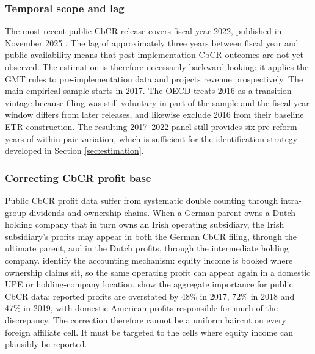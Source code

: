 \documentclass[11pt,a4paper]{article}
\begin{document}
\subsubsection{Temporal scope and lag}\label{sec:temporal}

The most recent public CbCR release covers fiscal year 2022, published in November 2025 \citep{oecd2025a}. The lag of approximately three years between fiscal year and public availability means that post-implementation CbCR outcomes are not yet observed. The estimation is therefore necessarily backward-looking: it applies the GMT rules to pre-implementation data and projects revenue prospectively. The main empirical sample starts in 2017. The OECD treats 2016 as a transition vintage because filing was still voluntary in part of the sample and the fiscal-year window differs from later releases, and \citet{hugger2026} likewise exclude 2016 from their baseline ETR construction. The resulting 2017--2022 panel still provides six pre-reform years of within-pair variation, which is sufficient for the identification strategy developed in Section \ref{sec:estimation}.

\subsubsection{Correcting CbCR profit base}\label{sec:doublecounting}

Public CbCR profit data suffer from systematic double counting through intra-group dividends and ownership chains. When a German parent owns a Dutch holding company that in turn owns an Irish operating subsidiary, the Irish subsidiary's profits may appear in both the German CbCR filing, through the ultimate parent, and in the Dutch profits, through the intermediate holding company. \citet{blouin2023} identify the accounting mechanism: equity income is booked where ownership claims sit, so the same operating profit can appear again in a domestic UPE or holding-company location. \citet{garcia-bernardo2022a} show the aggregate importance for public CbCR data: reported profits are overstated by 48\% in 2017, 72\% in 2018 and 47\% in 2019, with domestic American profits responsible for much of the discrepancy. The correction therefore cannot be a uniform haircut on every foreign affiliate cell. It must be targeted to the cells where equity income can plausibly be reported.
\end{document}
